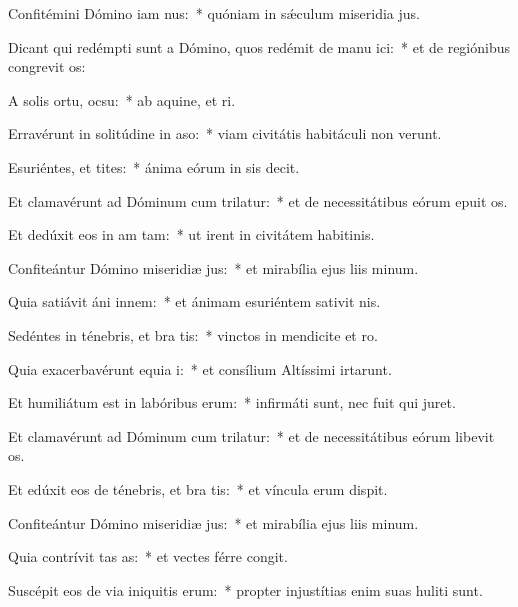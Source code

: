 \item Confitémini Dómino iam nus:~* quóniam in sǽculum miseridia jus.
\item Dicant qui redémpti sunt a Dómino, quos redémit de manu ici:~* et de regiónibus congrevit os:
\item A solis ortu,  ocsu:~* ab aquine, et ri.
\item Erravérunt in solitúdine in aso:~* viam civitátis habitáculi non verunt.
\item Esuriéntes, et tites:~* ánima eórum in sis decit.
\item Et clamavérunt ad Dóminum cum trilatur:~* et de necessitátibus eórum epuit os.
\item Et dedúxit eos in am tam:~* ut irent in civitátem habitinis.
\item Confiteántur Dómino miseridiæ jus:~* et mirabília ejus liis minum.
\item Quia satiávit áni innem:~* et ánimam esuriéntem sativit nis.
\item Sedéntes in ténebris, et bra tis:~* vinctos in mendicite et ro.
\item Quia exacerbavérunt equia i:~* et consílium Altíssimi irtarunt.
\item Et humiliátum est in labóribus  erum:~* infirmáti sunt, nec fuit qui juret.
\item Et clamavérunt ad Dóminum cum trilatur:~* et de necessitátibus eórum libevit os.
\item Et edúxit eos de ténebris, et bra tis:~* et víncula erum dispit.
\item Confiteántur Dómino miseridiæ jus:~* et mirabília ejus liis minum.
\item Quia contrívit tas as:~* et vectes férre congit.
\item Suscépit eos de via iniquitis erum:~* propter injustítias enim suas huliti sunt.
